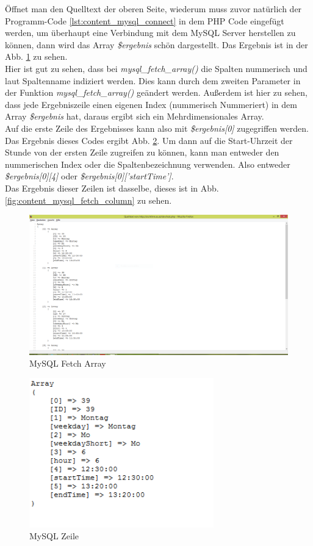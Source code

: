 Öffnet man den Quelltext der oberen Seite, wiederum muss zuvor natürlich der Programm-Code \ref{lst:content_mysql_connect} in dem PHP Code eingefügt werden, um überhaupt eine Verbindung mit dem MySQL Server herstellen zu können, dann wird das Array \textit{\$ergebnis} schön dargestellt. Das Ergebnis ist in der Abb. \ref{fig:content_mysql_fetch_array} zu sehen.\\
Hier ist gut zu sehen, dass bei \textit{mysql\_fetch\_array()} die Spalten nummerisch und laut Spaltenname indiziert werden. Dies kann durch dem zweiten Parameter in der Funktion \textit{mysql\_fetch\_array()} geändert werden. Außerdem ist hier zu sehen, dass jede Ergebniszeile einen eigenen Index (nummerisch Nummeriert) in dem Array \textit{\$ergebnis} hat, daraus ergibt sich ein Mehrdimensionales Array.\\
Auf die erste Zeile des Ergebnisses kann also mit \textit{\$ergebnis[0]} zugegriffen werden. Das Ergebnis dieses Codes ergibt Abb. \ref{fig:content_mysql_fetch_row}. Um dann auf die Start-Uhrzeit der Stunde von der ersten Zeile zugreifen zu können, kann man entweder den nummerischen Index oder die Spaltenbezeichnung verwenden. Also entweder \textit{\$ergebnis[0][4]} oder \textit{\$ergebnis[0]['startTime']}.\\ Das Ergebnis dieser Zeilen ist dasselbe, dieses ist in Abb. \ref{fig:content_mysql_fetch_column} zu sehen.\\
\begin{figure}[H]
\centering
\includegraphics[keepaspectratio=true, width=14cm]{images/screenshots/content_mysql_fetch_array.png}
\caption{MySQL Fetch Array}
\label{fig:content_mysql_fetch_array}
\end{figure}
\begin{figure}[H]
\centering
\includegraphics[keepaspectratio=true, width=8cm]{images/screenshots/content_mysql_fetch_row.png}
\caption{MySQL Zeile}
\label{fig:content_mysql_fetch_row}
\end{figure}
